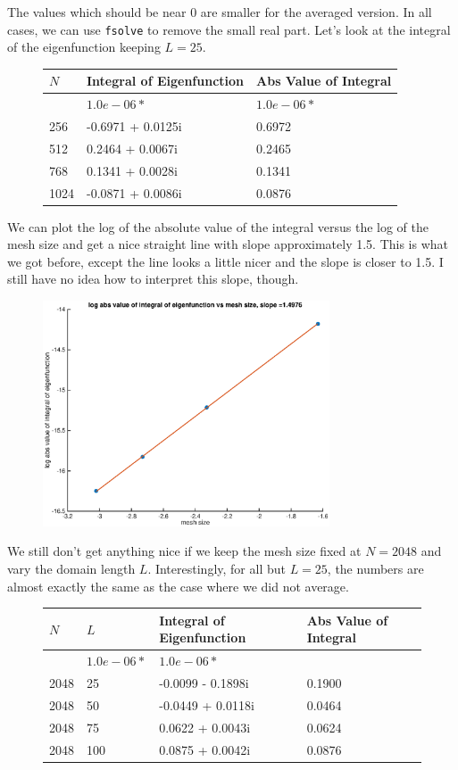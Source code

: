 \documentclass[12pt]{article}
\begin{document}
The values which should be near 0 are smaller for the averaged version. In all cases, we can use \texttt{fsolve} to remove the small real part. Let's look at the integral of the eigenfunction keeping $L = 25$.
\begin{figure}[H]
\begin{tabular}{l|ll}
  $N$   &  Integral of Eigenfunction & Abs Value of Integral \\ \hline
        &   $1.0e-06 *$         & $1.0e-06 *$ \\
  256   &    -0.6971 + 0.0125i  & 0.6972 \\ 
  512   &     0.2464 + 0.0067i  & 0.2465 \\ 
  768   &     0.1341 + 0.0028i  & 0.1341 \\
  1024  &    -0.0871 + 0.0086i  & 0.0876 \\
\end{tabular}
\end{figure}

We can plot the log of the absolute value of the integral versus the log of the mesh size and get a nice straight line with slope approximately 1.5. This is what we got before, except the line looks a little nicer and the slope is closer to 1.5. I still have no idea how to interpret this slope, though.

\begin{figure}[H]
\includegraphics[width=8.5cm]{2doublelogabsintegralN}
\end{figure}

We still don't get anything nice if we keep the mesh size fixed at $N = 2048$ and vary the domain length $L$. Interestingly, for all but $L = 25$, the numbers are almost exactly the same as the case where we did not average.
\begin{figure}[H]
\begin{tabular}{l|lll}
  $N$   &  $L$ & Integral of Eigenfunction & Abs Value of Integral \\ \hline
        &   $1.0e-06 *$         & $1.0e-06 *$ \\
  2048  & 25    &  -0.0099 - 0.1898i &  0.1900 \\ 
  2048  & 50    &  -0.0449 + 0.0118i &  0.0464 \\ 
  2048  & 75    &   0.0622 + 0.0043i &  0.0624 \\
  2048  & 100   &   0.0875 + 0.0042i &  0.0876 \\
\end{tabular}
\end{figure}
\end{document}
